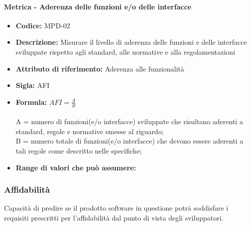               \paragraph{Metrica - Aderenza delle funzioni e/o delle interfacce} 
              \begin{itemize}
          \item  \textbf{Codice:} MPD-02
        \item    \textbf{Descrizione:} Misurare il livello di aderenza delle funzioni e delle interfacce sviluppate rispetto agli standard, alle normative e alla regolamentazioni
          \item  \textbf{Attributo di riferimento:} Aderenza alle funzionalità 
        \item    \textbf{Sigla:} AFI
         \item   \textbf{Formula:} \begin{math}AFI = \frac{A}{B}\end{math}\\ \\
              A = numero di funzioni(e/o interfacce) sviluppate che risultano aderenti a standard, regole e normative emesse al riguardo; \\
              B = numero totale di funzioni(e/o interfacce) che devono essere aderenti a tali regole come descritto nelle specifiche;
         \item  \textbf{Range di valori che può assumere:}
               \end{itemize}
  \subsubsection{Affidabilità} 
  Capacità di predire se il prodotto software in questione potrà soddisfare i requisiti prescritti per l'affidabilità dal punto di vista degli sviluppatori.\
